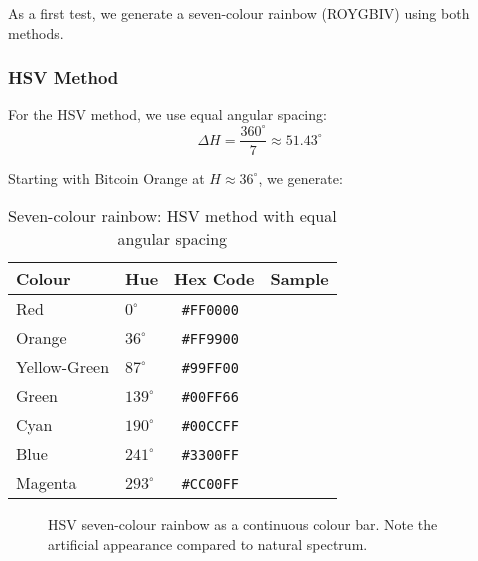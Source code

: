 \documentclass[12pt,a4paper]{article}
\newcommand{\hexcolour}[1]{%
  \definecolor{tempcolour}{HTML}{#1}%
  \texttt{\##1}~\raisebox{0.2ex}{\fboxsep=0pt\fbox{\colorbox{tempcolour}{\phantom{XX}}}}%
}
\begin{document}
As a first test, we generate a seven-colour rainbow (ROYGBIV) using both methods.

\subsubsection{HSV Method}

For the HSV method, we use equal angular spacing:
\begin{equation}
\Delta H = \frac{360^\circ}{7} \approx 51.43^\circ
\end{equation}

Starting with Bitcoin Orange at $H \approx 36^\circ$, we generate:

\begin{table}[ht]
\centering
\caption{Seven-colour rainbow: HSV method with equal angular spacing}
\label{tab:hsv-rainbow}
\begin{tabular}{llcc}
\toprule
\textbf{Colour} & \textbf{Hue} & \textbf{Hex Code} & \textbf{Sample} \\
\midrule
Red & $0^\circ$ & \hexcolour{FF0000} & \cellcolor{red}\phantom{XXX} \\
Orange & $36^\circ$ & \hexcolour{FF9900} & \cellcolor{bitcoinorange}\phantom{XXX} \\
Yellow-Green & $87^\circ$ & \hexcolour{99FF00} & \cellcolor{yellow!50!green}\phantom{XXX} \\
Green & $139^\circ$ & \hexcolour{00FF66} & \cellcolor{green!80!cyan}\phantom{XXX} \\
Cyan & $190^\circ$ & \hexcolour{00CCFF} & \cellcolor{cyan}\phantom{XXX} \\
Blue & $241^\circ$ & \hexcolour{3300FF} & \cellcolor{blue!80!violet}\phantom{XXX} \\
Magenta & $293^\circ$ & \hexcolour{CC00FF} & \cellcolor{magenta}\phantom{XXX} \\
\bottomrule
\end{tabular}
\end{table}

\begin{figure}[H]
\centering
{}
\caption{HSV seven-colour rainbow as a continuous colour bar. Note the artificial appearance compared to natural spectrum.}
\label{fig:hsv-rainbow-bar}
\end{figure}
\end{document}
